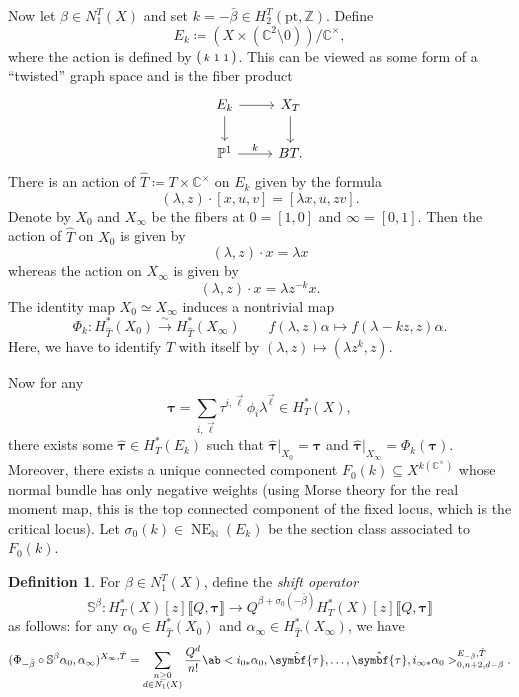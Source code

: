 \documentclass{amsart}
\theoremstyle{definition}
\newtheorem{defn}[thm]{Definition}
\theoremstyle{remark}
\theoremstyle{plain}
\theoremstyle{definition}
\theoremstyle{remark}
\newcommand{\N}{\mathbb{N}}
\newcommand{\C}{\mathbb{C}}
\newcommand{\Z}{\mathbb{Z}}
\newcommand{\bS}{\mathbb{S}}
\renewcommand{\P}{\mathbb{P}}
\newcommand{\btau}{\symbf{\tau}}
\newcommand{\mr}[1]{\mathrm{#1}}
\newcommand{\on}[1]{\operatorname{#1}}
\newcommand{\1}{\mathbf{1}}
\newcommand{\2}{\mathbf{2}}
\newcommand{\3}{\mathbf{3}}
\newcommand{\ps}[1]{\lBrack #1 \rBrack}
\begin{document}
Now let \(\beta \in N_1^T(X)\) and set \(k = -\bar{\beta} \in H_2^T(\mr{pt}, \Z)\). Define
\[ E_k \coloneqq (X \times (\C^2 \setminus 0)) / \C^{\times}, \]
where the action is defined by \(\begin{psmallmatrix}
    k & 1 & 1 
\end{psmallmatrix}\). This can be viewed as some form of a ``twisted'' graph space and is the fiber product
\begin{equation*}
\begin{tikzcd}
    E_k \ar{r} \ar{d} & X_T \ar{d} \\
    \P^1 \ar{r}{k} & BT.
\end{tikzcd}
\end{equation*}
There is an action of \(\hat{T} \coloneqq T \times \C^{\times}\) on \(E_k\) given by the formula
\[ (\lambda, z) \cdot [x,u,v] = [\lambda x, u, zv]. \]
Denote by \(X_0\) and \(X_{\infty}\) be the fibers at \(0 = [1,0]\) and \(\infty = [0,1]\). Then the action of \(\hat{T}\) on \(X_0\) is given by
\[ (\lambda, z) \cdot x = \lambda x \]
whereas the action on \(X_{\infty}\) is given by
\[ (\lambda, z) \cdot x = \lambda z^{-k} x. \]
The identity map \(X_0 \simeq X_{\infty}\) induces a nontrivial map
\[ \Phi_k \colon H_{\hat{T}}^*(X_0) \xrightarrow{\sim} H_{\hat{T}}^*(X_{\infty}) \qquad f(\lambda, z) \alpha \mapsto f(\lambda - kz, z) \alpha. \]
Here, we have to identify \(\hat{T}\) with itself by \((\lambda, z) \mapsto (\lambda z^k, z)\).

Now for any
\[ \btau = \sum_{i, \vec{\ell}} \tau^{i, \vec{\ell}}\phi_i \lambda^{\vec{\ell}} \in H_T^*(X), \]
there exists some \(\hat{\btau} \in H_T^*(E_k)\) such that \(\hat{\btau}|_{X_0} = \btau\) and \(\hat{\btau} |_{X_{\infty}} = \Phi_k(\btau)\). Moreover, there exists a unique connected component \(F_0(k) \subseteq X^{k(\C^{\times})}\) whose normal bundle has only negative weights (using Morse theory for the real moment map, this is the top connected component of the fixed locus, which is the critical locus). Let \(\sigma_0(k) \in \on{NE}_{\N}(E_k)\) be the section class associated to \(F_0(k)\).

\begin{defn}
    For \(\beta \in N_1^T(X)\), define the \textit{shift operator}
    \[ \bS^{\beta} \colon H_T^*(X)[z]\ps{Q, \btau} \to Q^{\beta + \sigma_0(-\bar{\beta})} H_T^*(X)[z]\ps{Q, \btau} \]
    as follows: for any \(\alpha_0 \in H_{\hat{T}}^*(X_0)\) and \(\alpha_{\infty} \in H_{\hat{T}}^*(X_{\infty})\), we have
    \[ (\Phi_{-\bar{\beta}} \circ \bS^{\beta} \alpha_0, \alpha_{\infty})^{X_{\infty}, \hat{T}} = \sum_{\substack{n \geq 0 \\ d \in N_1(X)}} \frac{Q^d}{n!} \ab< i_{0*} \alpha_0, \hat{\btau}, \ldots, \hat{\btau}, i_{\infty *} \alpha_0>_{0,n+2, d-\beta}^{E_{-\bar{\beta}}, \hat{T}}. \]
\end{defn}
\end{document}
